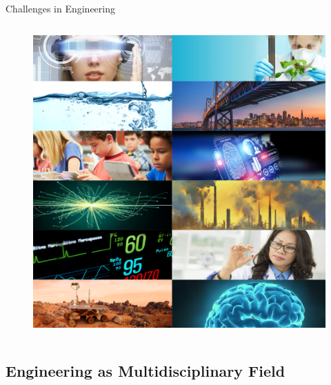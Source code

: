 {\begin{frame}{Challenges in Engineering}
\begin{columns}
  \begin{column}{.4\linewidth}
      \begin{figure}
        \centering
        \includegraphics[scale=0.2]{./figs/challenges/versions/drawing-v01.png}
        \caption{}
      \end{figure}
    \end{column}
  \end{columns}

\end{frame}
}






\subsection{Engineering as Multidisciplinary Field}

